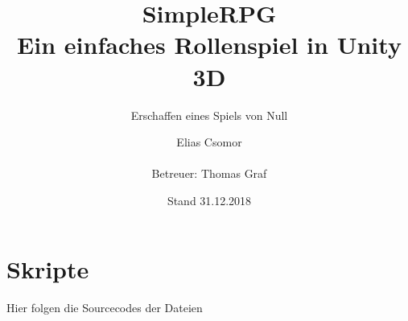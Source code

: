 \documentclass[a4paper,openright]{scrreprt} %
\title{SimpleRPG \\
 Ein einfaches Rollenspiel in Unity 3D}
\subtitle{Erschaffen eines Spiels von Null}
\author{\texorpdfstring{Elias Csomor\\[1cm]\\[1cm] {\small Betreuer: Thomas Graf}}{Elias Csomor}}
\date{\small Stand 31.12.2018}
\begin{document}
\maketitle %
\cleardoublepage
{} %
\tableofcontents %
\cleardoublepage %











\chapter{Skripte}

Hier folgen die Sourcecodes der Dateien 
% 
\listoffigures %
%
\printbibliography[title=Quellenverzeichnis]
\end{document}
